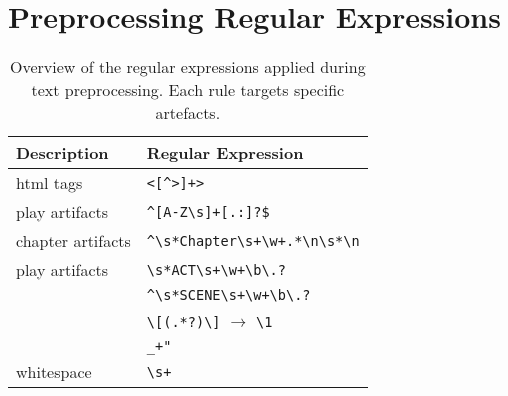 
\chapter{Preprocessing Regular Expressions}
\label{app:regex_preproc}

\begin{table}[H]%
  \caption{Overview of the regular expressions applied during text preprocessing. 
            Each rule targets specific artefacts.}
  \label{tab:regex}%
  \centering\small
  \begin{tabular}{@{}ll@{}} %
    \toprule
    \textbf{Description} & \textbf{Regular Expression}  \\
    \midrule
            html tags             & \verb|<[^>]+>| \\
            play artifacts        & \verb|^[A-Z\s]+[.:]?$| \\
            chapter artifacts     & \verb|^\s*Chapter\s+\w+.*\n\s*\n| \\
            play artifacts        & \verb|\s*ACT\s+\w+\b\.?| \\
                                  & \verb|^\s*SCENE\s+\w+\b\.?| \\
                                  & \verb|\[(.*?)\]| $\rightarrow$ \verb|\1| \\
                                  & \verb|_+"| \\
            whitespace           & \verb|\s+| \\


    \bottomrule
  \end{tabular}
\end{table}
